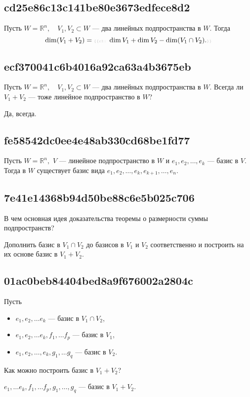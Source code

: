 \documentclass[11pt, a5paper]{article}
\newenvironment{note}[1]{\goodbreak\par\subsection{\hfill \color{lightgray}\tiny #1}}{}
\newenvironment{cloze}[2][\ldots]{\begin{leftbar}}{\end{leftbar}}
\newenvironment{icloze}[2][\ldots]{%
  \ignorespaces\text{\tiny \color{lightgray} \{\{c#2:: }%
}{%
  \text{\tiny \color{lightgray}\}\}}\unskip%
}
\begin{document}
\begin{note}{cd25e86c13c141be80e3673edfece8d2}
    Пусть \( W = \mathbb R ^{n}, \quad V_1, V_2 \subset W \) --- два линейных подпространства в \( W. \)
    Тогда
    \[
        \dim (V_1 + V_2) = \begin{icloze}{1}\dim V_1 + \dim V_2 - \dim (V_1 \cap V_2).\end{icloze}
    \]
\end{note}

\begin{note}{ecf370041c6b4016a92ca63a4b3675eb}
    Пусть \( W = \mathbb R ^{n}, \quad V_1, V_2 \subset W \) --- два линейных подпространства в \( W. \)
    Всегда ли \( V_1 + V_2 \) --- тоже линейное подпространство в \( W \)?

    \begin{cloze}{1}
        Да, всегда.
    \end{cloze}
\end{note}

\begin{note}{fe58542dc0ee4e48ab330cd68be1fd77}
    Пусть \( W = \mathbb R ^{n}, \) \(V  \) --- линейное подпространство в \( W \) и \( e_1, e_2, \ldots, e_k  \)  --- \begin{icloze}{2}базис в \( V. \)\end{icloze}
    Тогда в \( W \) существует базис вида \begin{icloze}{1}\( e_1, e_2, \ldots, e_k, e_{k + 1}, \ldots, e_n.  \)\end{icloze}
\end{note}

\begin{note}{7e41e14368b94d50be88c6e5b025c706}
    В чем основная идея доказательства теоремы о размерности суммы подпространств?

    \begin{cloze}{1}
        Дополнить базис в \( V_1 \cap V_2 \) до базисов в \( V_1 \) и \( V_2 \) соответственно и построить на их основе базис в \( V_1 + V_2 \).
    \end{cloze}
\end{note}

\begin{note}{01ac0beb84404bed8a9f676002a2804c}
    Пусть
    \begin{itemize}
        \item \( e_1,e_2,\ldots e_k \) --- базис в \( V_1 \cap V_2 \),
        \item \( e_1,e_2,\ldots e_k, f_1,\ldots f_p \) --- базис в \( V_1 \),
        \item \( e_1,e_2,\ldots, e_k, g_1,\ldots g_q \) --- базис в \( V_2 \).
    \end{itemize}
    Как можно построить базис в \( V_1 + V_2 \)?

    \begin{cloze}{1}
        \( e_1,\ldots e_k, f_1,\ldots f_p, g_1,\ldots, g_q \) --- базис в \( V_1 + V_2 \).
    \end{cloze}
\end{note}
\end{document}
